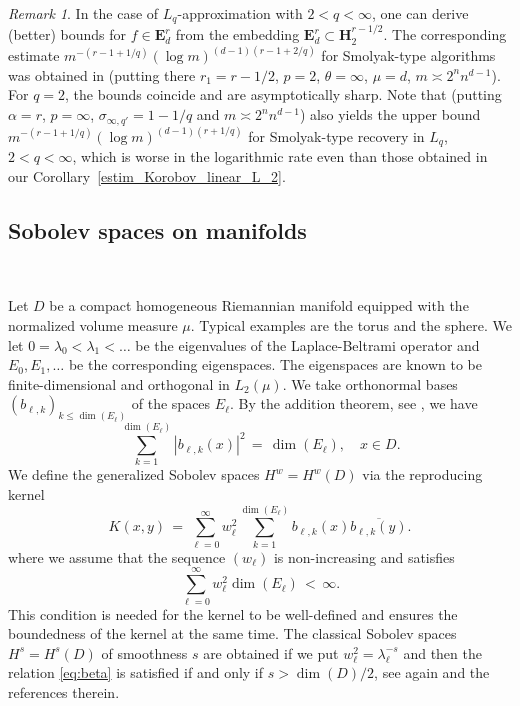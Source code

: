 \documentclass[a4paper,12pt]{amsart}
\theoremstyle{definition}
\theoremstyle{remark}
\newtheorem{remark}[theorem]{Remark}
\begin{document}
{\begin{remark}
In the case of $L_q$-approximation with 
$2 {<}
q < \infty$, 
one can derive (better) 
bounds for $f\in \mathbf{E}^r_d$  from the embedding $\mathbf{E}^r_d \subset \mathbf{H}^{r-1/2}_2$. 
The corresponding estimate $m^{-(r-1+1/q)} (\log m)^{(d-1)(r-1+2/q)}$ for Smolyak-type algorithms was obtained in \cite[Thm. 6.6]{Byrenheid_Ullrich2017} 
(putting there $r_1 = r-1/2$, $p=2$, $\theta = \infty$, $\mu = d$, $m\asymp 2^n n^{d-1}$). 
For $q=2$, the bounds coincide and are asymptotically sharp. 
 {Note that}
\cite[Thm. 5.1 (Remark\ 6.4)]{Kol_Lomako_Tikhonov23} (putting $\alpha =r$, $p=\infty$,  
$\sigma_{\infty, q'}=1-1/q$ and $m\asymp 2^n n^{d-1}$) also yields the upper bound $m^{-(r-1+1/q)} (\log m)^{(d-1)(r+ 1/q)}$ for 
Smolyak-type recovery in $L_q$, $2<q< \infty$, which is worse in the logarithmic rate even than those obtained in our Corollary~\ref{estim_Korobov_linear_L_2}.
\end{remark}













\subsection{Sobolev spaces on manifolds}
\label{subsec:mani} \,

Let $D$ be a compact homogeneous Riemannian manifold
equipped with the normalized volume measure $\mu$.
Typical examples are the torus and the sphere.
We let $0= \lambda_0 < \lambda_1 < \dots$ be the eigenvalues of the Laplace-Beltrami operator and $E_0, E_1, \dots$ be the corresponding eigenspaces. The eigenspaces are known to be finite-dimensional and orthogonal in $L_2(\mu)$. We take orthonormal bases $(b_{\ell,k})_{k\le \dim(E_\ell)}$ of the spaces $E_\ell$. By the addition theorem, see \cite[Thm.~3.2]{Gin},
we have
\[
 \sum_{k=1}^{\dim(E_\ell)} |b_{\ell,k}(x)|^2 \,=\, \dim(E_\ell),
 \quad x\in D.
\]
We define the generalized Sobolev spaces $H^w=H^w(D)$ via the reproducing kernel
\[
 K(x,y) \,=\, \sum_{\ell=0}^\infty w_\ell^2 \sum_{k=1}^{\dim(E_\ell)} b_{\ell,k}(x) \overline{b_{\ell,k}(y)}.
\]
where we assume that the sequence $(w_\ell)$ is non-increasing and satisfies
\begin{equation}\label{eq:beta}
 \sum_{\ell=0}^\infty w_\ell^2 \dim(E_\ell) \,<\, \infty.
\end{equation}
This condition 
is needed for the kernel to be well-defined
and ensures the boundedness of the kernel at the same time.
The classical Sobolev spaces $H^s=H^s(D)$ of smoothness $s$ are obtained
if we put $w_{\ell}^2 = \lambda_\ell^{-s}$
and then the relation \eqref{eq:beta} is satisfied if and only if $s>\dim(D)/2$, see again \cite{Gin} and the references therein.

}
\end{document}
